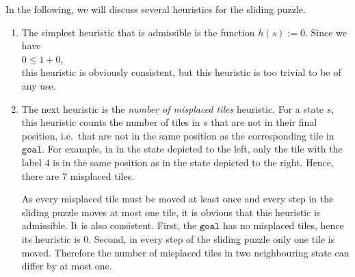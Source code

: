 \examples
In the following, we will discuss several heuristics for the sliding puzzle. 
\begin{enumerate}
\item The simplest heuristic that is admissible is the function $h(s) := 0$.  Since we have
      \\[0.2cm]
      \hspace*{1.3cm}
      $0 \leq 1 + 0$,
      \\[0.2cm]
      this heuristic is obviously consistent, but this heuristic is too trivial to be of any use.
\item The next heuristic is the \emph{\color{blue}number of misplaced tiles} heuristic.  For a state $s$, 
      this heuristic counts the number of tiles in $s$ that are not in their final position, i.e.~that are not
      in the same position as the corresponding tile in $\mathtt{goal}$.  For example, in 
      in the state depicted to the left, only the tile with the label $4$ is in the same
      position as in the state depicted to the right.  Hence, there are 7 misplaced tiles.

      As every misplaced tile must be moved at least once and every step in the sliding puzzle moves at most
      one tile, it is obvious that this heuristic is admissible.  It is also consistent.  First, the
      $\mathtt{goal}$ has no misplaced tiles, hence its heuristic is $0$.  Second, in every step of the sliding
      puzzle  only one tile is moved.  Therefore the number of misplaced tiles in two neighbouring state can
      differ by at most one.


\end{enumerate}
